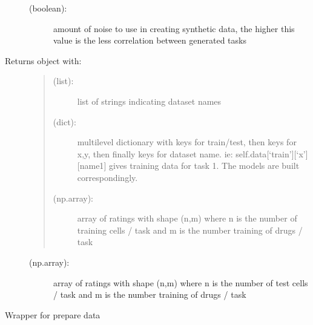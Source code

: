 \documentclass[letterpaper,10pt,english,openany,oneside]{sphinxmanual}
\begin{document}
\begin{fulllineitems}
\begin{description}
\begin{description}
\item[{ (boolean):}] \leavevmode
amount of noise to use in creating synthetic data, the higher this value is the less correlation between generated tasks

\end{description}

\item[{Returns object with:}] \leavevmode\begin{quote}
\begin{description}
\item[{ (list): }] \leavevmode
list of strings indicating dataset names

\item[{ (dict): }] \leavevmode
multilevel dictionary with keys for train/test, then keys for x,y, then finally keys for dataset name.
ie: self.data{[}‘train’{]}{[}‘x’{]}{[}name1{]} gives training data for task 1. The models are built correspondingly.

\item[{ (np.array): }] \leavevmode
array of ratings with shape (n,m) where n is the number of training cells / task and m is the number training of drugs / task

\end{description}
\end{quote}
\begin{description}
\item[{ (np.array): }] \leavevmode
array of ratings with shape (n,m) where n is the number of test cells / task and m is the number training of drugs / task

\end{description}

\end{description}

\begin{fulllineitems}
\label{\detokenize{data:datasets.SyntheticData.SyntheticDataCreator.create_x_and_y}}
Wrapper for prepare data

\end{fulllineitems}



\end{fulllineitems}
\end{document}
